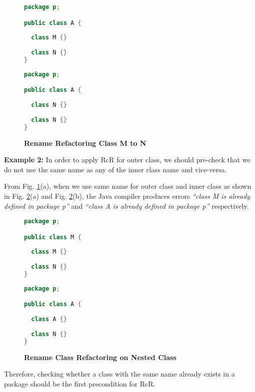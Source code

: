 \begin{figure}[th]
\centering
\begin{minipage}[t]{0.45\linewidth}
\begin{lstlisting}[language=java, basicstyle=\scriptsize\ttfamily,frame=single]
package p;

public class A {	
  
  class M {}
	
  class N {}
} 
\end{lstlisting}
\end{minipage}
\hfill
\begin{minipage}[t]{0.45\linewidth}
\begin{lstlisting}[language=java, basicstyle=\scriptsize\ttfamily,frame=single]
package p;

public class A {	
    
  class N {}
    
  class N {}
} 
\end{lstlisting}
\end{minipage}
\caption{\textbf{Rename Refactoring Class M to N}}
\label{figure:nestedclass1}
\end{figure}


\textbf{Example 2:} In order to apply RcR for outer class, we should pre-check that we do not use the same name as any of the inner class name and vice-versa. 

From Fig. \ref{figure:nestedclass1}(a), when we use same name for outer class and inner class as shown in Fig. \ref{figure:nestedclass2}(a) and Fig. \ref{figure:nestedclass2}(b), the Java compiler produces errors \textit{``class M is already defined in package p''} and \textit{``class A is already defined in package p''} respectively. 

\begin{figure}[th]
\centering
\begin{minipage}[t]{0.45\linewidth}
\begin{lstlisting}[language=java, basicstyle=\scriptsize\ttfamily,frame=single]
package p;

public class M {	
  
  class M {}
	
  class N {}
} 
\end{lstlisting}
\end{minipage}
\hfill
\begin{minipage}[t]{0.45\linewidth}
\begin{lstlisting}[language=java, basicstyle=\scriptsize\ttfamily,frame=single]
package p;

public class A {	
    
  class A {}
    
  class N {}
} 
\end{lstlisting}
\end{minipage}
\caption{\textbf{Rename Class Refactoring on Nested Class}}
\label{figure:nestedclass2}
\end{figure}

Therefore, checking whether a class with the same name already exists in a package should be the first precondition for RcR. 
   
